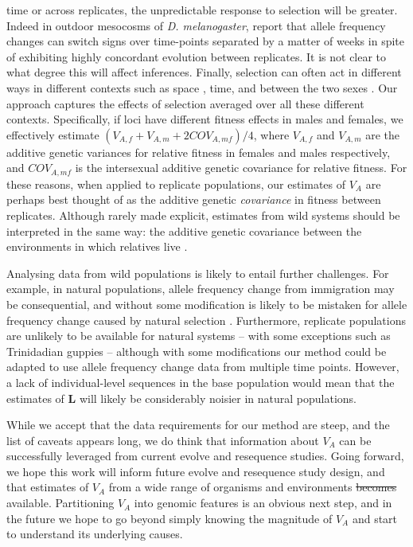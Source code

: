 \documentclass[12pt]{article}
\makeatletter
\providecommand{\DIFaddtex}[1]{{\protect\color{blue}\uwave{#1}}} %
\providecommand{\DIFdeltex}[1]{{\protect\color{red}\sout{#1}}} %
\providecommand{\DIFaddbegin}{} %
\providecommand{\DIFaddend}{} %
\providecommand{\DIFdelbegin}{} %
\providecommand{\DIFdelend}{} %
\providecommand{\DIFadd}[1]{\texorpdfstring{\DIFaddtex{#1}}{#1}} %
\providecommand{\DIFdel}[1]{\texorpdfstring{\DIFdeltex{#1}}{}} %
\newcommand{\DIFscaledelfig}{0.5}
\newlength{\DIFdelgraphicswidth} %
\newlength{\DIFdelgraphicsheight} %
\newcommand{\DIFaddincludegraphics}[2][]{{\color{blue}\fbox{\DIFOincludegraphics[#1]{#2}}}} %
\newcommand{\DIFdelincludegraphics}[2][]{%
\sbox{\DIFdelgraphicsbox}{\DIFOincludegraphics[#1]{#2}}%
\settoboxwidth{\DIFdelgraphicswidth}{\DIFdelgraphicsbox} %
\settoboxtotalheight{\DIFdelgraphicsheight}{\DIFdelgraphicsbox} %
\scalebox{\DIFscaledelfig}{%
\parbox[b]{\DIFdelgraphicswidth}{\usebox{\DIFdelgraphicsbox}\\[-\baselineskip] \rule{\DIFdelgraphicswidth}{0em}}\llap{\resizebox{\DIFdelgraphicswidth}{\DIFdelgraphicsheight}{%
\setlength{\unitlength}{\DIFdelgraphicswidth}%
\begin{picture}(1,1)%
\thicklines\linethickness{2pt} %
{\color[rgb]{1,0,0}\put(0,0){\framebox(1,1){}}}%
{\color[rgb]{1,0,0}\put(0,0){\line( 1,1){1}}}%
{\color[rgb]{1,0,0}\put(0,1){\line(1,-1){1}}}%
\end{picture}%
}\hspace*{3pt}}} %
} %
\DeclareRobustCommand{\DIFaddbegin}{\DIFOaddbegin \let\includegraphics\DIFaddincludegraphics} %
\DeclareRobustCommand{\DIFaddend}{\DIFOaddend \let\includegraphics\DIFOincludegraphics} %
\DeclareRobustCommand{\DIFdelbegin}{\DIFOdelbegin \let\includegraphics\DIFdelincludegraphics} %
\DeclareRobustCommand{\DIFdelend}{\DIFOaddend \let\includegraphics\DIFOincludegraphics} %
\let\sout@orig\sout %
\renewcommand{\sout}[1]{\ifmmode\text{\sout@orig{\ensuremath{#1}}}\else\sout@orig{#1}\fi} %
\makeatother
\begin{document}
\begin{bibunit}
time or across replicates, the unpredictable response to selection will be greater. Indeed in outdoor mesocosms of \emph{D. melanogaster}, \citet{Bitter.2024} report that allele frequency changes can switch signs over time-points separated by a matter of weeks in spite of exhibiting highly concordant evolution between replicates. It is not clear to what degree this will affect inferences. Finally, selection can often act in different ways in different contexts such as space \citep{whitlock2015modern, delph2018study}, time, and between the two sexes \citep{schenkel2018making}. Our approach captures the effects of selection averaged over all these different contexts. Specifically, if loci have different fitness effects in males and females, we effectively estimate $(V_{A,f} + V_{A,m} + 2COV_{A,mf})/4$, where $V_{A,f}$ and $V_{A,m}$ are the additive genetic variances for relative fitness in females and males respectively, and $COV_{A,mf}$ is the intersexual additive genetic covariance for relative fitness. For these reasons, when applied to replicate populations, our estimates of $V_A$ are perhaps best thought of as the additive genetic \emph{covariance} in fitness between replicates. Although rarely made explicit, estimates from wild systems should be interpreted in the same way: the additive genetic covariance between the environments in which relatives live \citep{Vehvilainen.2008}.   

Analysing data from wild populations is likely to entail further challenges. For example, in natural populations, allele frequency change from immigration may be consequential, and without some modification is likely to be mistaken for allele frequency change caused by natural selection \citep{simon2024contribution}. Furthermore, replicate populations are unlikely to be available for natural systems -- with some exceptions such as Trinidadian guppies \citep{reznick1996life} -- although with some modifications our method could be adapted to use allele frequency change data from multiple time points. However, a lack of individual-level sequences in the base population would mean that the estimates of $\textbf{L}$ will likely be considerably noisier in natural populations. 

While we accept that the data requirements for our method are steep, and the list of caveats appears long, we do think that information about $V_A$ can be successfully leveraged from current evolve and resequence studies. Going forward, we hope this work will inform future evolve and resequence study design, and that estimates of $V_A$ from a wide range of organisms and environments \DIFdelbegin \DIFdel{becomes }\DIFdelend \DIFaddbegin \DIFadd{become }\DIFaddend available. Partitioning $V_A$ into genomic features is an obvious next step, and in the future we hope to go beyond simply knowing the magnitude of $V_A$ and start to understand its underlying causes.


\end{bibunit}
\end{document}
